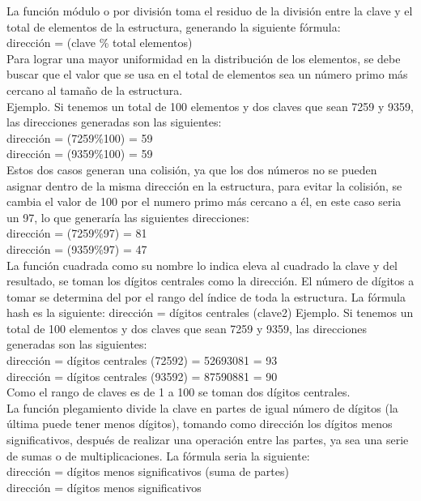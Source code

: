 \documentclass[letterpaper,openright,12pt]{report}
\begin{document}
La función módulo o por división toma el residuo de la división entre la
clave y el total de elementos de la estructura, generando la siguiente
fórmula: \\[0.4cm]dirección = (clave \% total elementos)\\[0.4cm] Para lograr una mayor
uniformidad en la distribución de los elementos, se debe buscar que el
valor que se usa en el total de elementos sea un número primo más
cercano al tamaño de la estructura. \\Ejemplo. Si tenemos un total de 100
elementos y dos claves que sean 7259 y 9359, las direcciones generadas
son las siguientes: \\[0.4cm]dirección = (7259\%100) = 59 \\dirección = (9359\%100)
= 59 \\[0.4cm]Estos dos casos generan una colisión, ya que los dos números no se
pueden asignar dentro de la misma dirección en la estructura, para
evitar la colisión, se cambia el valor de 100 por el numero primo más
cercano a él, en este caso seria un 97, lo que generaría las siguientes
direcciones:\\[0.4cm] dirección = (7259\%97) = 81 \\dirección = (9359\%97) = 47\\[2.0cm]
La función cuadrada como su nombre lo indica eleva al cuadrado la clave
y del resultado, se toman los dígitos centrales como la dirección. El
número de dígitos a tomar se determina del por el rango del índice de
toda la estructura. La fórmula hash es la siguiente: dirección = dígitos
centrales (clave2) Ejemplo. Si tenemos un total de 100 elementos y dos
claves que sean 7259 y 9359, las direcciones generadas son las
siguientes:\\[0.4cm] dirección = dígitos centrales (72592) = 52693081 = 93\\
dirección = dígitos centrales (93592) = 87590881 = 90\\ 
Como el rango de
claves es de 1 a 100 se toman dos dígitos centrales.\\[0.4cm]
La función plegamiento divide la clave en partes de igual número de
dígitos (la última puede tener menos dígitos), tomando como dirección
los dígitos menos significativos, después de realizar una operación
entre las partes, ya sea una serie de sumas o de multiplicaciones. La
fórmula seria la siguiente:\\[0.4cm] dirección = dígitos menos significativos
(suma de partes)\\ dirección = dígitos menos significativos
\end{document}
